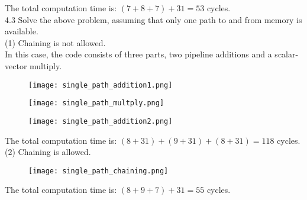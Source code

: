 \documentclass[12pt]{report}
\begin{document}
The total computation time is: $(7 + 8 + 7) + 31 = 53$ cycles. \\

4.3 Solve the above problem, assuming that only one path to and from memory is available. \\

(1) Chaining is not allowed. \\
In this case, the code consists of three parts, two pipeline additions and a scalar-vector multiply. \\

\begin{figure}[hb]
\begin{center}
\texttt{[image: single\_path\_addition1.png]}
\end{center}
\end{figure}

\begin{figure}[hb]
\begin{center}
\texttt{[image: single\_path\_multply.png]}
\end{center}
\end{figure}

\begin{figure}[hb]
\begin{center}
\texttt{[image: single\_path\_addition2.png]}
\end{center}
\end{figure}

The total computation time is: $(8 + 31) + (9 + 31) + (8 + 31) = 118$ cycles. \\

(2) Chaining is allowed. \\

\begin{figure}[hb]
\begin{center}
\texttt{[image: single\_path\_chaining.png]}
\end{center}
\end{figure}

The total computation time is: $(8 + 9 + 7) + 31 = 55$ cycles. \\
\end{document}
